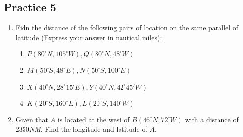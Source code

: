 \documentclass{report}
\begin{document}
\begin{multicols}{2}
    \subsection{Practice 5}

    \begin{enumerate}
        \item Fidn the distance of the following pairs of location on the same parallel of
              latitude (Express your answer in nautical miles):
              \begin{enumerate}
                  \item $P(80^\circ N, 105^\circ W), Q(80^\circ N, 48^\circ W)$
                  \item $M(50^\circ S, 48^\circ E), N(50^\circ S, 100^\circ E)$
                  \item $X(40^\circ N, 28^\circ 15' E), Y(40^\circ N, 42^\circ 45' W)$
                  \item $K(20^\circ S, 160^\circ E), L(20^\circ S, 140^\circ W)$
              \end{enumerate}
        \item Given that $A$ is located at the west of $B(46^\circ N, 72^\circ W)$ with a
              distance of $2350$\emph{NM}. Find the longitude and latitude of $A$.
    \end{enumerate}

\end{multicols}
\end{document}
